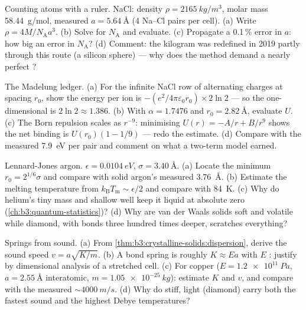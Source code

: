\begin{exercise}[$\star\star$]\label{exo:b3:crystalline-solids:6}
Counting atoms with a ruler. NaCl: density
$\rho = \qty{2165}{kg/m^3}$, molar mass \qty{58.44}{g/mol},
measured  $a = \qty{5.64}{\angstrom}$ (4 Na--Cl
pairs per cell). (a) Write $\rho = 4M/N_{\text{A}}a^3$. (b) Solve
for $N_{\text{A}}$ and evaluate. (c) Propagate a 0.1\,\% error in
$a$: how big an error in $N_{\text{A}}$? (d) Comment: the kilogram
was redefined in 2019 partly through this  route (a silicon
sphere) --- why does the method demand a nearly perfect ?
\end{exercise}

\begin{exercise}[$\star\star$]\label{exo:b3:crystalline-solids:7}
The Madelung ledger. (a) For the infinite NaCl row of alternating
charges at spacing $r_0$, show the energy per ion is
$-(e^2/4\pi\varepsilon_0r_0)\times2\ln2$ --- so the
one-dimensional  is $2\ln2 \approx 1.386$. (b)
With $\alpha = 1.7476$ and $r_0 = \qty{2.82}{\angstrom}$, evaluate
$U$. (c) The Born repulsion scales as $r^{-9}$: minimising
$U(r) = -A/r + B/r^9$ shows the net binding is $U(r_0)(1 - 1/9)$
--- redo the estimate. (d) Compare with the measured
\qty{7.9}{eV} per pair and comment on what a two-term model earned.
\end{exercise}

\begin{exercise}[$\star\star$]\label{exo:b3:crystalline-solids:8}
Lennard-Jones argon. $\epsilon = \qty{0.0104}{eV}$, $\sigma =
\qty{3.40}{\angstrom}$. (a) Locate the minimum $r_0 = 2^{1/6}
\sigma$ and compare with solid argon's measured
\qty{3.76}{\angstrom}. (b) Estimate the melting temperature from
$k_{\text{B}}T_{\text{m}} \sim \epsilon/2$ and compare with
\qty{84}{K}. (c) Why do helium's tiny mass and shallow well keep
it liquid at absolute zero (\cref{ch:b3:quantum-statistics})? (d)
Why are van der Waals solids soft and volatile while diamond,
with bonds three hundred times deeper, scratches everything?
\end{exercise}

\begin{exercise}[$\star\star$]\label{exo:b3:crystalline-solids:9}
Springs from sound. (a) From
\cref{thm:b3:crystalline-solids:dispersion}, derive the sound
speed $v = a\sqrt{K/m}$. (b) A bond spring is roughly $K \approx
Ea$ with $E$ : justify by dimensional analysis of
a stretched cell. (c) For copper ($E = \qty{1.2e11}{Pa}$,
$a = \qty{2.55}{\angstrom}$ interatomic, $m =
\qty{1.05e-25}{kg}$): estimate $K$ and $v$, and compare with the
measured $\sim\qty{4000}{m/s}$. (d) Why do stiff, light 
(diamond) carry both the fastest sound and the highest Debye
temperatures?
\end{exercise}

